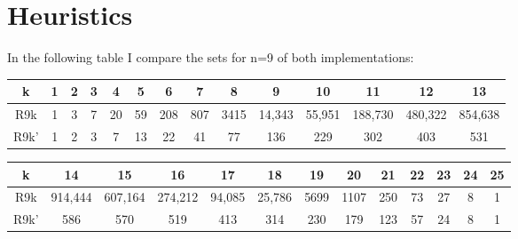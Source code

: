 \documentclass[../main.tex]{subfiles}
\begin{document}
	\section{Heuristics}
	In the following table I compare the sets for n=9 of both implementations:
	\begin{center}
		\begin{tabular}{||c c c c c c c c c c c c c c||} 
			\hline
			k & 1 & 2 & 3 & 4 & 5 & 6 & 7 & 8 & 9 & 10 & 11 & 12 & 13  \\ [0.5ex] 
			\hline\hline
			R9k& 1 & 3 & 7 & 20 & 59 & 208 & 807 & 3415 & 14,343 & 55,951 & 188,730 & 480,322 & 854,638 \\ 
			\hline
			R9k' & 1 & 2 & 3 & 7 & 13 & 22 & 41 & 77 & 136 & 229 & 302 & 403 & 531 \\  [1ex] 
			\hline
		\end{tabular}
	\end{center}
	\begin{center}
		\begin{tabular}{||c c c c c c c c c c c c c||} 
			\hline
			k & 14 & 15 & 16 & 17 & 18 & 19 & 20 & 21 & 22 & 23 & 24 & 25  \\ [0.5ex] 
			\hline\hline
			R9k & 914,444 & 607,164 & 274,212 & 94,085 & 25,786 & 5699 & 1107 & 250 & 73 & 27 & 8 & 1 \\ 
			\hline
			R9k' & 586 & 570 & 519 & 413 & 314 & 230 & 179 & 123 & 57 & 24 & 8 & 1 \\  [1ex] 
			\hline
		\end{tabular}
	\end{center}

	\begin{sortingnetwork}{9}{15}{1}
	\end{sortingnetwork}
	
\end{document}

